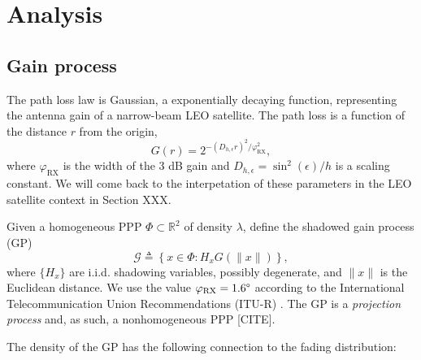 \documentclass[conference]{IEEEtran}
\newcommand{\R}{\mathbb{R}}
\theoremstyle{definition}
\theoremstyle{plain}
\begin{document}
         
         \section{Analysis}
         
         \subsection{Gain process}

         The path loss law is Gaussian, a exponentially decaying function, representing the antenna gain of a narrow-beam LEO satellite. The path loss is a function of the distance $r$ from the origin, 
         \begin{equation}
           G(r) = 2^{-(D_{h,\epsilon}r)^2/\varphi^2_{\text{RX}}},
         \end{equation}
         where $\varphi_{\text{RX}}$ is the width of the $3$ dB gain and $D_{h,\epsilon}=\sin^2(\epsilon)/h$ is a scaling constant. We will come back to the interpetation of these parameters in the LEO satellite context in Section XXX. 
          

         Given a homogeneous PPP $\Phi \subset \R^2$ of density $\lambda$, define the shadowed gain process (GP)
         \begin{equation}
           \label{eq:gainprocess}
           \mathcal{G} \triangleq \left\{x \in \Phi : H_x G(\|x\|) \right\},
          \end{equation}
          where $\{H_x\}$ are i.i.d. shadowing variables, possibly degenerate, and $\|x\|$ is the Euclidean distance. We use the value $\varphi_{\text{RX}} = 1.6 \degree$ according to the International Telecommunication Union Recommendations (ITU-R) \cite{ITURS1528}. The GP is a \textit{projection process} and, as such, a nonhomogeneous PPP [CITE].

          The density of the GP has the following connection to the fading distribution:
\end{document}
